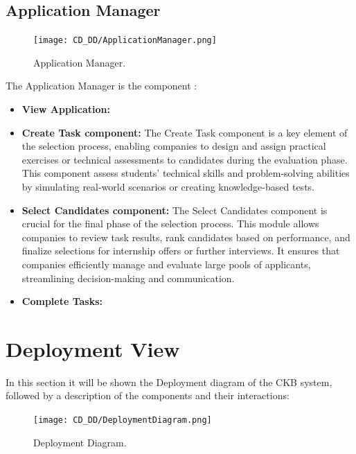 \subsection{Application Manager}
\label{subsec:application_manager}%

\begin{figure}[H]
    \begin{center}
        \texttt{[image: CD\_DD/ApplicationManager.png]}
        \caption{Application Manager.}
        \label{fig:application_manager}%
    \end{center}
\end{figure}

\noindent The Application Manager is the component :

\begin{itemize}
    \item \textbf{View Application:}
    \item \textbf{Create Task component:} The Create Task component is a key element of the selection process, enabling companies to design and assign practical exercises or technical assessments to candidates during the evaluation phase. This component assess students' technical skills and problem-solving abilities by simulating real-world scenarios or creating knowledge-based tests.
    \item \textbf{Select Candidates component:} The Select Candidates component is crucial for the final phase of the selection process. This module allows companies to review task results, rank candidates based on performance, and finalize selections for internship offers or further interviews. It ensures that companies efficiently manage and evaluate large pools of applicants, streamlining decision-making and communication.
    \item \textbf{Complete Tasks:}
\end{itemize}


\section{Deployment View}
\label{sec:deployment_view}%

In this section it will be shown the Deployment diagram of the CKB system, followed by a description of the components and their interactions:
\begin{figure}[H]
    \begin{center}
        \texttt{[image: CD\_DD/DeploymentDiagram.png]}
        \caption{Deployment Diagram.}
        \label{fig:Deployment_Diagram}%
    \end{center}
\end{figure}

